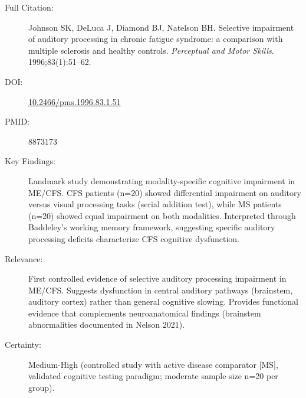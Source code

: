 \begin{description}
    \item[Full Citation:] Johnson SK, DeLuca J, Diamond BJ, Natelson BH. Selective impairment of auditory processing in chronic fatigue syndrome: a comparison with multiple sclerosis and healthy controls. \textit{Perceptual and Motor Skills}. 1996;83(1):51--62.
    \item[DOI:] \href{https://doi.org/10.2466/pms.1996.83.1.51}{10.2466/pms.1996.83.1.51}
    \item[PMID:] 8873173
    \item[Key Findings:] Landmark study demonstrating modality-specific cognitive impairment in ME/CFS. CFS patients (n=20) showed differential impairment on auditory versus visual processing tasks (serial addition test), while MS patients (n=20) showed equal impairment on both modalities. Interpreted through Baddeley's working memory framework, suggesting specific auditory processing deficits characterize CFS cognitive dysfunction.
    \item[Relevance:] First controlled evidence of selective auditory processing impairment in ME/CFS. Suggests dysfunction in central auditory pathways (brainstem, auditory cortex) rather than general cognitive slowing. Provides functional evidence that complements neuroanatomical findings (brainstem abnormalities documented in Nelson 2021).
    \item[Certainty:] Medium-High (controlled study with active disease comparator [MS], validated cognitive testing paradigm; moderate sample size n=20 per group).
\end{description}

